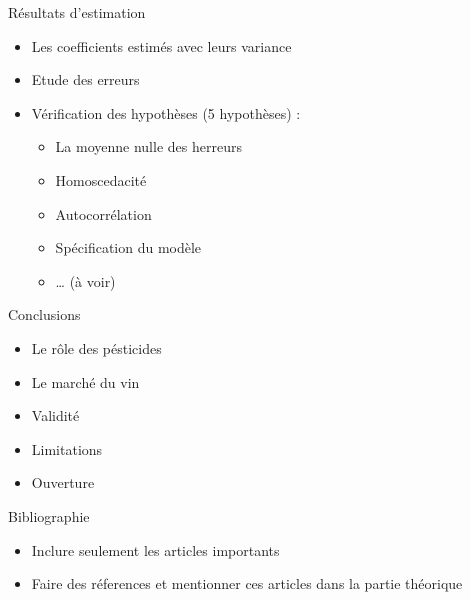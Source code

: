 \documentclass[11pt,ignorenonframetext,]{beamer}
\providecommand{\tightlist}{%
  \setlength{\itemsep}{0pt}\setlength{\parskip}{0pt}}
\begin{document}
\begin{frame}{Résultats d'estimation}
\protect\hypertarget{resultats-destimation}{}

\begin{itemize}
\tightlist
\item
  Les coefficients estimés avec leurs variance
\item
  Etude des erreurs
\item
  Vérification des hypothèses (5 hypothèses) :

  \begin{itemize}
  \tightlist
  \item
    La moyenne nulle des herreurs
  \item
    Homoscedacité
  \item
    Autocorrélation
  \item
    Spécification du modèle
  \item
    \ldots{} (à voir)
  \end{itemize}
\end{itemize}

\end{frame}

\begin{frame}{Conclusions}
\protect\hypertarget{conclusions}{}

\begin{itemize}
\tightlist
\item
  Le rôle des pésticides
\item
  Le marché du vin
\item
  Validité
\item
  Limitations
\item
  Ouverture
\end{itemize}

\end{frame}

\begin{frame}{Bibliographie}
\protect\hypertarget{bibliographie}{}

\begin{itemize}
\tightlist
\item
  Inclure seulement les articles importants
\item
  Faire des réferences et mentionner ces articles dans la partie
  théorique
\end{itemize}

\end{frame}
\end{document}
